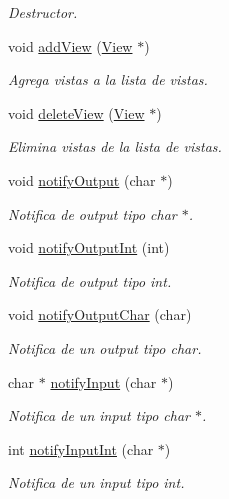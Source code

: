 \begin{DoxyCompactItemize}
\begin{DoxyCompactList}\small\item\em Destructor. \end{DoxyCompactList}\item 
void \hyperlink{class_model_a5cdcdd24e529d6a8c8e0804d41e1c1fc}{add\+View} (\hyperlink{class_view}{View} $\ast$)
\begin{DoxyCompactList}\small\item\em Agrega vistas a la lista de vistas. \end{DoxyCompactList}\item 
void \hyperlink{class_model_a9bfb8dc6d332b86592b08050ca0debda}{delete\+View} (\hyperlink{class_view}{View} $\ast$)
\begin{DoxyCompactList}\small\item\em Elimina vistas de la lista de vistas. \end{DoxyCompactList}\item 
void \hyperlink{class_model_a9bb776b622153d782936d55e80dbb8c6}{notify\+Output} (char $\ast$)
\begin{DoxyCompactList}\small\item\em Notifica de output tipo char $\ast$. \end{DoxyCompactList}\item 
void \hyperlink{class_model_a5ab8965d490fee7f941a061c510eba08}{notify\+Output\+Int} (int)
\begin{DoxyCompactList}\small\item\em Notifica de output tipo int. \end{DoxyCompactList}\item 
void \hyperlink{class_model_a2428b409ff14fbd7247465850481f822}{notify\+Output\+Char} (char)
\begin{DoxyCompactList}\small\item\em Notifica de un output tipo char. \end{DoxyCompactList}\item 
char $\ast$ \hyperlink{class_model_ae1a72659a294ad394d7bad30c1a7d9c4}{notify\+Input} (char $\ast$)
\begin{DoxyCompactList}\small\item\em Notifica de un input tipo char $\ast$. \end{DoxyCompactList}\item 
int \hyperlink{class_model_a6363623b712b863ac40ba6bd1ab187df}{notify\+Input\+Int} (char $\ast$)
\begin{DoxyCompactList}\small\item\em Notifica de un input tipo int. \end{DoxyCompactList}\item 

\end{DoxyCompactItemize}
